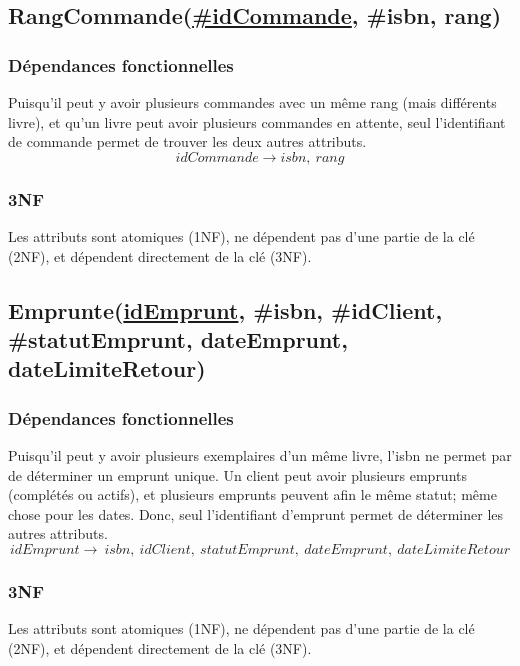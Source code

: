 \documentclass{article}
\begin{document}
\subsection{RangCommande(\underline{\#idCommande}, \#isbn, rang)}
\subsubsection{Dépendances fonctionnelles}
Puisqu'il peut y avoir plusieurs commandes avec un même rang (mais différents
livre), et qu'un livre peut avoir plusieurs commandes en attente, seul
l'identifiant de commande permet de trouver les deux autres attributs.
$$idCommande \rightarrow isbn, \ rang$$

\subsubsection{3NF}
Les attributs sont atomiques (1NF), ne dépendent pas d'une partie de la clé
(2NF), et dépendent directement de la clé (3NF).

\subsection{Emprunte(\underline{idEmprunt}, \#isbn, \#idClient,
  \#statutEmprunt, dateEmprunt, dateLimiteRetour)}
\subsubsection{Dépendances fonctionnelles}
Puisqu'il peut y avoir plusieurs exemplaires d'un même livre, l'isbn ne permet
par de déterminer un emprunt unique. Un client peut avoir plusieurs emprunts
(complétés ou actifs), et plusieurs emprunts peuvent afin le même statut; même
chose pour les dates. Donc, seul l'identifiant d'emprunt permet de déterminer
les autres attributs.
$$idEmprunt \rightarrow \ isbn, \ idClient,\ statutEmprunt, \ dateEmprunt, \
dateLimiteRetour$$

\subsubsection{3NF}
Les attributs sont atomiques (1NF), ne dépendent pas d'une partie de la clé
(2NF), et dépendent directement de la clé (3NF).
\end{document}

